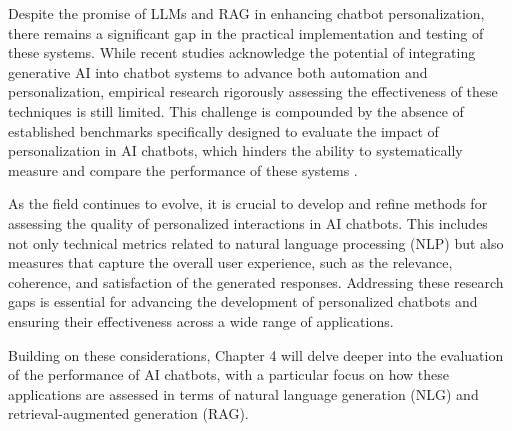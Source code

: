 Despite the promise of LLMs and RAG in enhancing chatbot personalization, there remains a significant gap in the practical implementation and testing of these systems. While recent studies acknowledge the potential of integrating generative AI into chatbot systems to advance both automation and personalization, empirical research rigorously assessing the effectiveness of these techniques is still limited. This challenge is compounded by the absence of established benchmarks specifically designed to evaluate the impact of personalization in AI chatbots, which hinders the ability to systematically measure and compare the performance of these systems \cite{verma2023generative}.

As the field continues to evolve, it is crucial to develop and refine methods for assessing the quality of personalized interactions in AI chatbots. This includes not only technical metrics related to natural language processing (NLP) but also measures that capture the overall user experience, such as the relevance, coherence, and satisfaction of the generated responses. Addressing these research gaps is essential for advancing the development of personalized chatbots and ensuring their effectiveness across a wide range of applications.

Building on these considerations, Chapter 4 will delve deeper into the evaluation of the performance of AI chatbots, with a particular focus on how these applications are assessed in terms of natural language generation (NLG) and retrieval-augmented generation (RAG).
